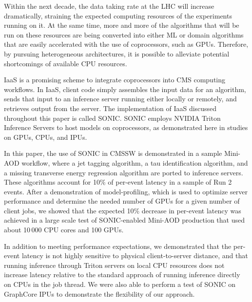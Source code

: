 Within the next decade, the data taking rate at the LHC will increase dramatically, straining the expected computing resources of the experiments running on it. At the same time, more and more of the algorithms that will be run on these resources are being converted into either ML or domain algorithms that are easily accelerated with the use of coprocessors, such as GPUs. Therefore, by pursuing heterogeneous architectures, it is possible to alleviate potential shortcomings of available CPU resources.

IaaS is a promising scheme to integrate coprocessors into CMS computing workflows. In IaaS, client code simply assembles the input data for an algorithm, sends that input to an inference server running either locally or remotely, and retrieves output from the server. The implementation of IaaS discussed throughout this paper is called SONIC. SONIC employs NVIDIA Triton Inference Servers to host models on coprocessors, as demonstrated here in studies on GPUs, CPUs, and IPUs. %

In this paper, the use of SONIC in CMSSW is demonstrated in a sample Mini-AOD workflow, where a jet tagging algorithm, a tau identification algorithm, and a missing transverse energy regression algorithm are ported to inference servers. These algorithms account for 10\% of per-event latency in a sample of Run 2 \ttbar events. After a demonstration of model-profiling, which is used to optimize server performance and determine the needed number of GPUs for a given number of client jobs, we showed that the expected 10\% decrease in per-event latency was achieved in a large scale test of SONIC-enabled Mini-AOD production that used about 10\,000 CPU cores and 100 GPUs.

In addition to meeting performance expectations, we demonstrated that the per-event latency is not highly sensitive to physical client-to-server distance, and that running inference through Triton servers on local CPU resources does not increase latency relative to the standard approach of running inference directly on CPUs in the job thread. We were also able to perform a test of SONIC on GraphCore IPUs to demonstrate the flexibility of our approach.

